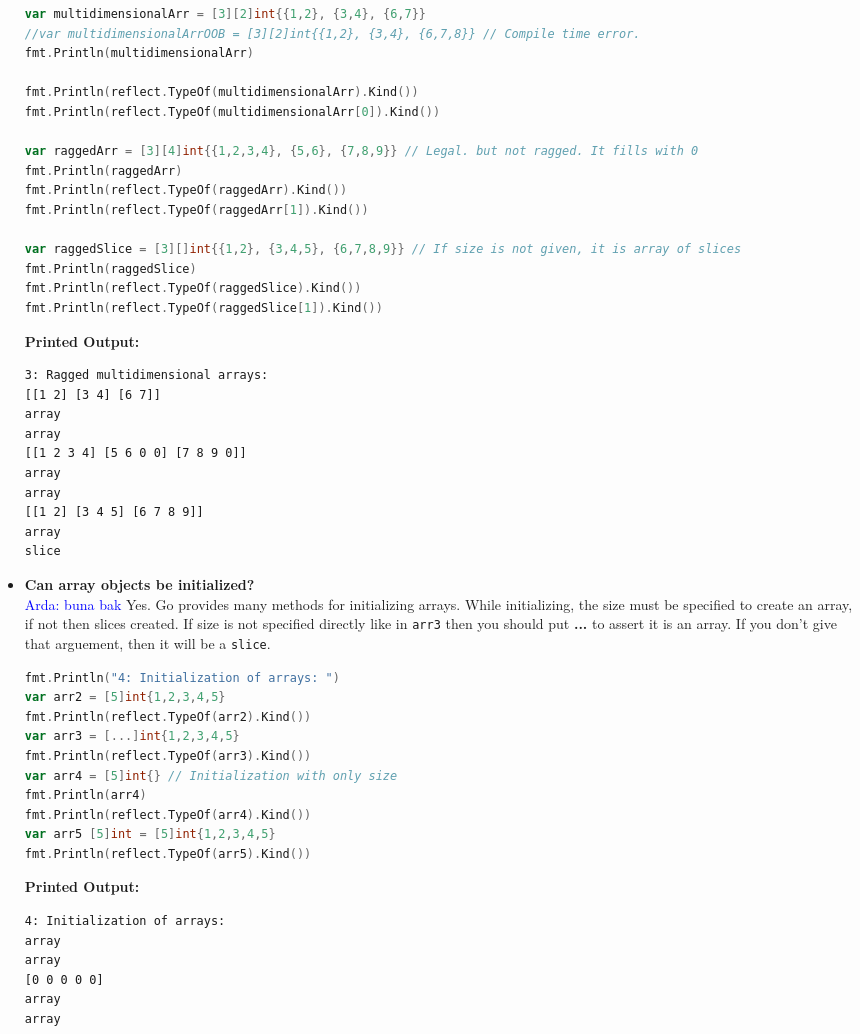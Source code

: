 \documentclass{article}
\newcommand{\arda}[1]{\textcolor{blue}{Arda: #1}}
\begin{document}
\begin{itemize}
\begin{lstlisting}[language=GO]
var multidimensionalArr = [3][2]int{{1,2}, {3,4}, {6,7}}
//var multidimensionalArrOOB = [3][2]int{{1,2}, {3,4}, {6,7,8}} // Compile time error.
fmt.Println(multidimensionalArr)

fmt.Println(reflect.TypeOf(multidimensionalArr).Kind())
fmt.Println(reflect.TypeOf(multidimensionalArr[0]).Kind())

var raggedArr = [3][4]int{{1,2,3,4}, {5,6}, {7,8,9}} // Legal. but not ragged. It fills with 0
fmt.Println(raggedArr)
fmt.Println(reflect.TypeOf(raggedArr).Kind())
fmt.Println(reflect.TypeOf(raggedArr[1]).Kind())

var raggedSlice = [3][]int{{1,2}, {3,4,5}, {6,7,8,9}} // If size is not given, it is array of slices
fmt.Println(raggedSlice)
fmt.Println(reflect.TypeOf(raggedSlice).Kind())
fmt.Println(reflect.TypeOf(raggedSlice[1]).Kind())
\end{lstlisting}
\textbf{Printed Output:}
\begin{verbatim}
3: Ragged multidimensional arrays: 
[[1 2] [3 4] [6 7]]
array
array
[[1 2 3 4] [5 6 0 0] [7 8 9 0]]
array
array
[[1 2] [3 4 5] [6 7 8 9]]
array
slice
\end{verbatim}



\item \textbf{Can array objects be initialized?} \\  
\arda{buna bak}
Yes. Go provides many methods for initializing arrays. While initializing, the size must be specified to create an array, if not then slices created. If size is not specified directly like in \texttt{arr3} then you should put \textbf{...} to assert it is an array. If you don't give that arguement, then it will be a \texttt{slice}.
\begin{lstlisting}[language=Go]
fmt.Println("4: Initialization of arrays: ")
var arr2 = [5]int{1,2,3,4,5}
fmt.Println(reflect.TypeOf(arr2).Kind())
var arr3 = [...]int{1,2,3,4,5}
fmt.Println(reflect.TypeOf(arr3).Kind())
var arr4 = [5]int{} // Initialization with only size
fmt.Println(arr4)
fmt.Println(reflect.TypeOf(arr4).Kind())
var arr5 [5]int = [5]int{1,2,3,4,5}
fmt.Println(reflect.TypeOf(arr5).Kind())
\end{lstlisting}
\textbf{Printed Output:}
\begin{verbatim}
4: Initialization of arrays: 
array
array
[0 0 0 0 0]
array
array
\end{verbatim}




\end{itemize}
\end{document}
